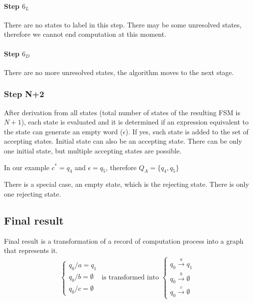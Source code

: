 \documentclass{article}
\begin{document}
\begin{multicols}{2}
\paragraph{Step $6_L$} There are no states to label in this step. There may be some unresolved
states, therefore we cannot end computation at this moment.

\paragraph{Step $6_D$} There are no more unresolved states, the algorithm moves to the next stage.

\end{multicols}

\subsubsection{Step N+2}
After derivation from all states (total number of states of the resulting FSM is $N+1$), each state
is evaluated and it is determined if an expression equivalent to the state can generate an empty
word ($\epsilon$). If yes, such state is added to the set of accepting states. Initial state can
also be an accepting state. There can be only one initial state, but multiple accepting states are
possible.

In our example $c^* = q_4$ and $\epsilon = q_5$, therefore $Q_A = \{ q_4, q_5 \}$
 
There is a special case, an empty state, which is the rejecting state. There is only one rejecting
state.

\subsection{Final result}
Final result is a transformation of a record of computation process into a graph that represents it.
\begin{gather*}
\begin{cases}
q_0 / a = q_1 \\
q_0 / b = \emptyset \\
q_0 / c = \emptyset
\end{cases}
\mbox{ is transformed into }
\begin{cases}
q_0 \overset{a}{\rightarrow} q_1 \\
q_0 \overset{b}{\rightarrow} \emptyset \\
q_0 \overset{c}{\rightarrow} \emptyset
\end{cases}
\end{gather*}
\end{document}
